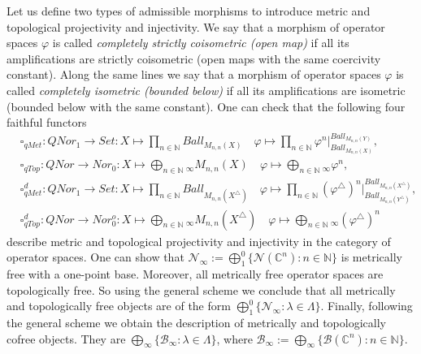 \documentclass[a0b,landscape]{a0poster}
\begin{document}
\begin{multicols}{4}
Let us define two types of admissible morphisms to introduce metric and
topological projectivity and injectivity. We say that a morphism of operator
spaces $\varphi$ is called \textit{completely strictly coisometric (open map)}
if all its amplifications are strictly coisometric (open maps with the same
coercivity constant). Along the same lines we say that a morphism of operator
spaces $\varphi$ is called \textit{completely isometric (bounded below)} if all
its amplifications are isometric (bounded below with the same constant). One can
check that the following four faithful functors
$$
\begin{aligned}
&\square_{qMet} 
:QNor_1 \to Set 
:X\mapsto\prod_{n \in \mathbb{N}} Ball_{M_{n,n}(X)}\quad
\varphi\mapsto 
    \prod_{n\in\mathbb{N}} \varphi^{n}|_{
        Ball_{M_{n,n}(X)}}^{Ball_{M_{n,n}(Y)}},\\
&\square_{qTop}
:QNor \to Nor_0
:X \mapsto \bigoplus_{ n \in \mathbb{N}}{}_\infty M_{n,n}(X) \quad
\varphi\mapsto\bigoplus_{n\in\mathbb{N}}{}_\infty \varphi^{n},\\
&\square_{qMet}^d
:QNor_1 \to Set
:X\mapsto\prod_{n \in \mathbb{N}} Ball_{M_{n,n}(X^\triangle)}\quad
\varphi\mapsto \prod_{n\in\mathbb{N}} {(\varphi^\triangle)}^{n}|_{
    Ball_{M_{n,n}(Y^\triangle)}}^{Ball_{M_{n,n}(X^\triangle)}},\\
&\square_{qTop}^d
:QNor\to Nor_0^o
:X \mapsto \bigoplus_{ n \in \mathbb{N}}{}_\infty M_{n,n}(X^\triangle) \quad
\varphi\mapsto\bigoplus_{n\in\mathbb{N}}{}_\infty{(\varphi^\triangle)}^{n}
\end{aligned}
$$
describe metric and topological projectivity and injectivity in the category of
operator spaces. One can show that $\mathcal{N}_{\infty} := \bigoplus_1^0
\{\mathcal{N}(\mathbb{C}^n): n \in \mathbb{N}\}$ is metrically free with a
one-point base. Moreover, all metrically free operator spaces are topologically
free. So using the general scheme we conclude that all metrically and
topologically free objects are of the form $\bigoplus_1^0\{\mathcal{N}_\infty:
\lambda \in \Lambda \}$. Finally, following the general scheme we obtain the
description of metrically and topologically cofree objects. They are
$\bigoplus_\infty \{\mathcal{B}_\infty: \lambda \in \Lambda \}$, where
$\mathcal{B}_{\infty} := \bigoplus_\infty \{\mathcal{B}(\mathbb{C}^n): n \in
\mathbb{N}\}$.










\end{multicols}
\end{document}
